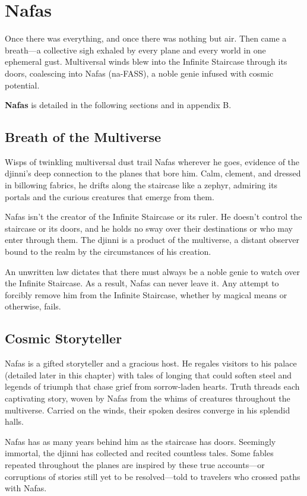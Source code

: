 \documentclass[10pt,a4paper,twoside,bg=print,twocolumn,openany,nodeprecatedcode]{dndbook}
\begin{document}
\section{Nafas}
Once there was everything, and once there was nothing but air. Then came a breath—a collective sigh exhaled by every plane and every world in one ephemeral gust. Multiversal winds blew into the Infinite Staircase through its doors, coalescing into Nafas (na-FASS), a noble genie infused with cosmic potential.

\textbf{Nafas} is detailed in the following sections and in appendix B.

\subsection{Breath of the Multiverse}
Wisps of twinkling multiversal dust trail Nafas wherever he goes, evidence of the djinni's deep connection to the planes that bore him. Calm, clement, and dressed in billowing fabrics, he drifts along the staircase like a zephyr, admiring its portals and the curious creatures that emerge from them.

Nafas isn't the creator of the Infinite Staircase or its ruler. He doesn't control the staircase or its doors, and he holds no sway over their destinations or who may enter through them. The djinni is a product of the multiverse, a distant observer bound to the realm by the circumstances of his creation.

An unwritten law dictates that there must always be a noble genie to watch over the Infinite Staircase. As a result, Nafas can never leave it. Any attempt to forcibly remove him from the Infinite Staircase, whether by magical means or otherwise, fails.

\subsection{Cosmic Storyteller}
Nafas is a gifted storyteller and a gracious host. He regales visitors to his palace (detailed later in this chapter) with tales of longing that could soften steel and legends of triumph that chase grief from sorrow-laden hearts. Truth threads each captivating story, woven by Nafas from the whims of creatures throughout the multiverse. Carried on the winds, their spoken desires converge in his splendid halls.

Nafas has as many years behind him as the staircase has doors. Seemingly immortal, the djinni has collected and recited countless tales. Some fables repeated throughout the planes are inspired by these true accounts—or corruptions of stories still yet to be resolved—told to travelers who crossed paths with Nafas.
\end{document}

